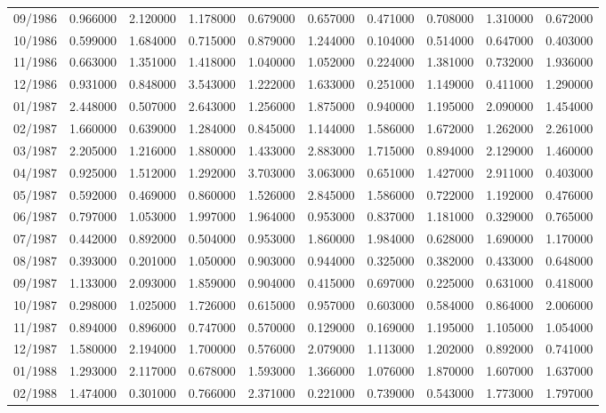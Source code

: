 \begin{tabular}{lrrrrrrrrr}
09/1986 & 0.966000 & 2.120000 & 1.178000 & 0.679000 & 0.657000 & 0.471000 & 0.708000 & 1.310000 & 0.672000 \\
10/1986 & 0.599000 & 1.684000 & 0.715000 & 0.879000 & 1.244000 & 0.104000 & 0.514000 & 0.647000 & 0.403000 \\
11/1986 & 0.663000 & 1.351000 & 1.418000 & 1.040000 & 1.052000 & 0.224000 & 1.381000 & 0.732000 & 1.936000 \\
12/1986 & 0.931000 & 0.848000 & 3.543000 & 1.222000 & 1.633000 & 0.251000 & 1.149000 & 0.411000 & 1.290000 \\
01/1987 & 2.448000 & 0.507000 & 2.643000 & 1.256000 & 1.875000 & 0.940000 & 1.195000 & 2.090000 & 1.454000 \\
02/1987 & 1.660000 & 0.639000 & 1.284000 & 0.845000 & 1.144000 & 1.586000 & 1.672000 & 1.262000 & 2.261000 \\
03/1987 & 2.205000 & 1.216000 & 1.880000 & 1.433000 & 2.883000 & 1.715000 & 0.894000 & 2.129000 & 1.460000 \\
04/1987 & 0.925000 & 1.512000 & 1.292000 & 3.703000 & 3.063000 & 0.651000 & 1.427000 & 2.911000 & 0.403000 \\
05/1987 & 0.592000 & 0.469000 & 0.860000 & 1.526000 & 2.845000 & 1.586000 & 0.722000 & 1.192000 & 0.476000 \\
06/1987 & 0.797000 & 1.053000 & 1.997000 & 1.964000 & 0.953000 & 0.837000 & 1.181000 & 0.329000 & 0.765000 \\
07/1987 & 0.442000 & 0.892000 & 0.504000 & 0.953000 & 1.860000 & 1.984000 & 0.628000 & 1.690000 & 1.170000 \\
08/1987 & 0.393000 & 0.201000 & 1.050000 & 0.903000 & 0.944000 & 0.325000 & 0.382000 & 0.433000 & 0.648000 \\
09/1987 & 1.133000 & 2.093000 & 1.859000 & 0.904000 & 0.415000 & 0.697000 & 0.225000 & 0.631000 & 0.418000 \\
10/1987 & 0.298000 & 1.025000 & 1.726000 & 0.615000 & 0.957000 & 0.603000 & 0.584000 & 0.864000 & 2.006000 \\
11/1987 & 0.894000 & 0.896000 & 0.747000 & 0.570000 & 0.129000 & 0.169000 & 1.195000 & 1.105000 & 1.054000 \\
12/1987 & 1.580000 & 2.194000 & 1.700000 & 0.576000 & 2.079000 & 1.113000 & 1.202000 & 0.892000 & 0.741000 \\
01/1988 & 1.293000 & 2.117000 & 0.678000 & 1.593000 & 1.366000 & 1.076000 & 1.870000 & 1.607000 & 1.637000 \\
02/1988 & 1.474000 & 0.301000 & 0.766000 & 2.371000 & 0.221000 & 0.739000 & 0.543000 & 1.773000 & 1.797000 \\

\end{tabular}
